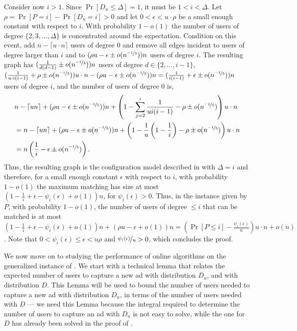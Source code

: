 \documentclass[11pt]{article}
\begin{document}
\begin{appendixproof}
Consider now $i>1$. Since $\Pr[D_u \leq \Delta]=1$, it must be $1<i<\Delta$. Let $\rho = \Pr[P=i] - \Pr[D_u =i] > 0$ and let $0<\epsilon<u\cdot \rho$ be a small enough constant with respect to $i$. With probability $1-o(1)$ the number of users of degree $\{2,3,\dots, \Delta\}$ is concentrated around the expectation. Condition on this event, add $n-\lceil u\cdot n\rceil$ users of degree 0 and remove all edges incident to users of degree larger than $i$ and to $(\rho u-\epsilon \pm o(n^{\nicefrac{-1}5}))n$ users of degree $i$. The resulting graph has $(\frac{1}{d(d-1)}\pm o(n^{\nicefrac{-1}{5}}))n$ users of degree $d\in\{2,\dots, i-1\}$, $(\frac{1}{u\cdot i(i-1)}+\rho \pm o(n^{\nicefrac{-1}5}))u\cdot n - (\rho u - \epsilon \pm o(n^{\nicefrac{-1}5}))n=(\frac{1}{i(i-1)}+\epsilon\pm o(n^{\nicefrac{-1}5}))n$ users of degree $i$, and the number of users of degree 0 is,
\begin{align*}
&n-\lceil un \rceil + (\rho u - \epsilon \pm o(n^{\nicefrac{-1}5}))n + \left(1-\sum_{j=2}^{i}\frac{1}{ui(i-1)}-\rho \pm  o(n^{\nicefrac{-1}5})\right)u\cdot n\\
&= n-\lceil un \rceil + (\rho u - \epsilon \pm o(n^{\nicefrac{-1}5}))n + \left(1-\frac{1}{u}\left(1 - \frac{1}{i}\right)-\rho \pm o(n^{\nicefrac{-1}5})\right)u\cdot n\\
& = n\left(\frac{1}{i} - \epsilon \pm o(n^{\nicefrac{-1}5})\right).
\end{align*}
Thus, the resulting graph is the configuration model described in  with $\Delta=i$ and therefore, for a small enough constant $\epsilon$ with respect to $i$, with probability $1-o(1)$ the maximum matching has size at most $(1-\frac{1}{i}+\epsilon-\psi_i(\epsilon) + o(1))n$, for $\psi_i(\epsilon)>0$. Thus, in the instance given by $P$, with probability $1-o(1)$, the number of users of degree $\leq i$ that can be matched is at most $(1-\frac{1}{i}+\epsilon-\psi_i(\epsilon) + o(1))n + (\rho u - \epsilon + o(1))n = (\Pr[P \leq i] - \frac{\psi_i(\epsilon)}{u})u\cdot n + o(n)$. Note that $0<\psi_i(\epsilon)\leq \epsilon < u\rho$ and $\nicefrac{\psi_i(\epsilon)}{u} > 0$, which concludes the proof.
\end{appendixproof}
We now move on to studying the performance of online algorithms on the generalized instance of . We start with a technical lemma that relates the expected number of users to capture a new ad with distribution $D_u$, and with distribution $D$. This Lemma will be used to bound the number of users needed to capture a new ad with distribution $D_u$, in terms of the number of users needed with $D$ --- we need this Lemma because the integral required to determine the number of users to capture an ad with $D_u$ is not easy to solve, while the one for $D$ has already been solved in the proof of .
\end{document}
